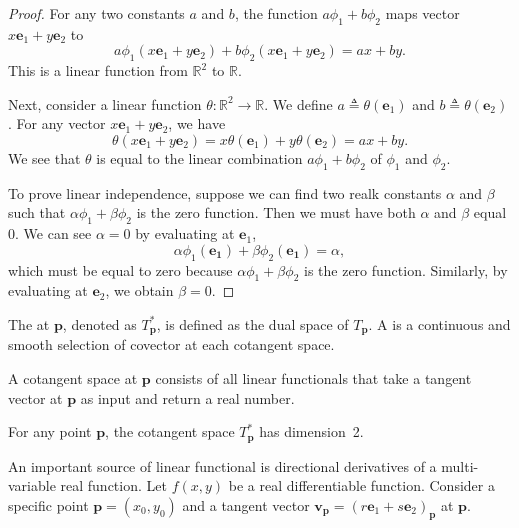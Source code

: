 \begin{proof}
For any two constants $a$ and $b$, the function $a\phi_1+b\phi_2$ maps vector $x\mathbf{e}_1 + y \mathbf{e}_2$ to 
$$
a\phi_1(x\mathbf{e}_1 + y \mathbf{e}_2)+b\phi_2(x\mathbf{e}_1 + y \mathbf{e}_2) = a x + b y.
$$
This is a linear function from $\mathbb{R}^2$ to $\mathbb{R}$.

Next, consider a linear function $\theta: \mathbb{R}^2 \rightarrow \mathbb{R}$. We define 
$a \triangleq \theta(\mathbf{e}_1)$ and
$b \triangleq \theta(\mathbf{e}_2)$. 
For any vector $x\mathbf{e}_1 + y \mathbf{e}_2$, we have
$$
\theta(x\mathbf{e}_1 + y \mathbf{e}_2) = 
x \theta(\mathbf{e}_1)  + y \theta(\mathbf{e}_2) =
ax + by.
$$
We see that $\theta$ is equal to the linear combination $a\phi_1 + b \phi_2$ of $\phi_1$ and $\phi_2$.

To prove linear independence, suppose we can find two realk constants $\alpha$ and $\beta$ such that $\alpha \phi_1 + \beta \phi_2$ is the zero function. Then we must have both $\alpha$ and $\beta$ equal 0. We can see $\alpha=0$ by evaluating at $\mathbf{e}_1$,
$$
\alpha \phi_1(\mathbf{e_1}) + \beta \phi_2(\mathbf{e_1})  = \alpha,
$$
which must be equal to zero because   $\alpha \phi_1 + \beta \phi_2$ is the zero function. Similarly, by evaluating at $\mathbf{e}_2$, we obtain $\beta=0$.
\end{proof}





\begin{svgraybox}
	\begin{definition}  
		The  at $\mathbf{p}$, denoted as $T_\mathbf{p}^*$, is defined as the dual space of $T_\mathbf{p}$. A  is a continuous and smooth selection of covector at each cotangent space.
	\end{definition}
\end{svgraybox}
A cotangent space at $\mathbf{p}$ consists of all linear functionals that take a tangent vector at $\mathbf{p}$ as input and return a real number.

\begin{svgraybox}
	\begin{theorem} For any point $\mathbf{p}$, 
		the cotangent space $T_\mathbf{p}^*$ has dimension~2.
	\end{theorem}
\end{svgraybox}

An important source of linear functional is directional derivatives of a multi-variable real function. Let   $f(x,y)$ be a real differentiable function. Consider 
a specific point $\mathbf{p}=(x_0,y_0)$ and a tangent vector $\mathbf{v}_\mathbf{p}=(r\mathbf{e}_1+s\mathbf{e}_2)_\mathbf{p}$  at $\mathbf{p}$.




